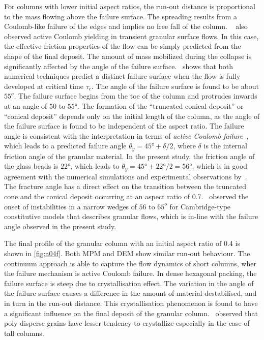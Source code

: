 For columns with lower initial aspect ratios, the run-out distance is 
proportional to the mass flowing above the failure surface. The spreading 
results from a Coulomb-like failure of the edges and implies no free fall of 
the column. ~\citet{Daerr1999} also observed active Coulomb yielding in 
transient granular surface flows. In this case, the effective friction 
properties of the flow can be simply predicted from the shape of the final 
deposit. The amount of mass mobilized during the collapse is significantly 
affected by the angle of the failure surface.~ shows that both 
numerical techniques predict a distinct failure surface when the flow is fully 
developed at critical time $\tau_{\textit{c}}$. The angle of the failure 
surface is found to be about $55^{o}$. The failure surface begins from the toe 
of the column and protrudes inwards at an angle of $50$ to 
$55\si{\degree}$. The formation of the ``truncated conical deposit'' or 
``conical deposit'' depends only on the initial length of the column, as the 
angle of the failure surface is found to be independent of the aspect ratio. 
The failure angle is consistent with the interpretation in terms of 
\textit{active Coulomb failure}~\citep{Lajeunesse2004}, which leads to a 
predicted failure angle $\theta_{\textit{y}}=45\si{\degree}+\delta / 2$, where 
$\delta$ is the internal friction angle of the granular material. In the 
present study, the friction angle of the glass beads is $22\si{\degree}$, which 
leads to $\theta_{\textit{y}}=45\si{\degree}+22\si{\degree}/ 2=56\si{\degree}$, 
which is in good agreement with the numerical simulations and experimental 
observations by~\citet{Lajeunesse2004}. The fracture angle has a 
direct effect on the transition between the truncated cone and the conical 
deposit occurring at an aspect ratio of 0.7.~\citet{Schaeffer1990} observed the 
onset of instabilities in a narrow wedges of $56\mbox{ to }65^{o}$ for 
Cambridge-type constitutive models that describes granular flows, which is 
in-line with the failure angle observed in the present study. 

The final profile of the granular column with an initial aspect ratio 
of 0.4 is shown in \cref{fig:a04f}. Both MPM and DEM show similar run-out 
behaviour. The continuum approach is able to capture the flow dynamics of short 
columns, wher the failure mechanism is active Coulomb failure. In dense 
hexagonal packing, the failure surface is steep due to crystallisation effect. 
The variation in the angle of the failure surface causes a difference in the 
amount of material destabilised, and in turn in the run-out distance. 
This crystallisation phenomenon is found to have a significant influence on the 
final deposit of the granular column.~\citet{Lacaze2009} observed that 
poly-disperse grains have lesser tendency to crystallize especially in the case 
of tall columns. 

